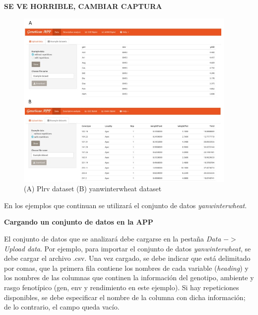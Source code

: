\textbf{SE VE HORRIBLE, CAMBIAR CAPTURA}

 \begin{figure}[H]
	\begin{center}
		\includegraphics[width=0.95\textwidth]{./Graficos/www/exampledata.png}
	\end{center}
	\caption{(A) Plrv dataset (B) yanwinterwheat dataset }
	\label{fig:dataexample}
\end{figure}

En los ejemplos que continuan se utilizará el conjunto de datos \emph{yanwinterwheat}.

\textbf{Cargando un conjunto de datos en la APP}

El conjunto de datos que se analizará debe cargarse en la pestaña \emph{Data $->$ Upload data}. Por ejemplo, para importar el conjunto de datos \emph{yanwinterwheat}, se debe cargar el archivo .csv. Una vez cargado, se debe indicar que está delimitado por comas, que la primera fila contiene los nombres de cada variable (\emph{heading}) y los nombres de las columnas que continen la información del genotipo, ambiente y rasgo fenotípico (gen, env y rendimiento en este ejemplo). Si hay repeticiones disponibles, se debe especificar el nombre de la columna con dicha información; de lo contrario, el campo queda vacío. 

